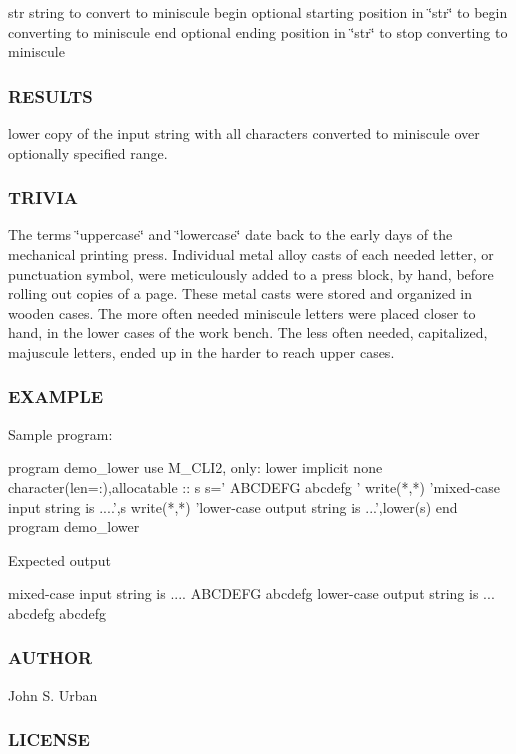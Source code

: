 str string to convert to miniscule begin optional starting position in \char`\"{}str\char`\"{} to begin converting to miniscule end optional ending position in \char`\"{}str\char`\"{} to stop converting to miniscule

\subsubsection*{R\+E\+S\+U\+L\+TS}

lower copy of the input string with all characters converted to miniscule over optionally specified range.

\subsubsection*{T\+R\+I\+V\+IA}

The terms \char`\"{}uppercase\char`\"{} and \char`\"{}lowercase\char`\"{} date back to the early days of the mechanical printing press. Individual metal alloy casts of each needed letter, or punctuation symbol, were meticulously added to a press block, by hand, before rolling out copies of a page. These metal casts were stored and organized in wooden cases. The more often needed miniscule letters were placed closer to hand, in the lower cases of the work bench. The less often needed, capitalized, majuscule letters, ended up in the harder to reach upper cases.

\subsubsection*{E\+X\+A\+M\+P\+LE}

Sample program\+: \begin{DoxyVerb}  program demo_lower
  use M_CLI2, only: lower
  implicit none
  character(len=:),allocatable  :: s
     s=' ABCDEFG abcdefg '
     write(*,*) 'mixed-case input string is ....',s
     write(*,*) 'lower-case output string is ...',lower(s)
  end program demo_lower
\end{DoxyVerb}


Expected output

mixed-\/case input string is .... A\+B\+C\+D\+E\+FG abcdefg lower-\/case output string is ... abcdefg abcdefg \subsubsection*{A\+U\+T\+H\+OR}

John S. Urban \subsubsection*{L\+I\+C\+E\+N\+SE}


